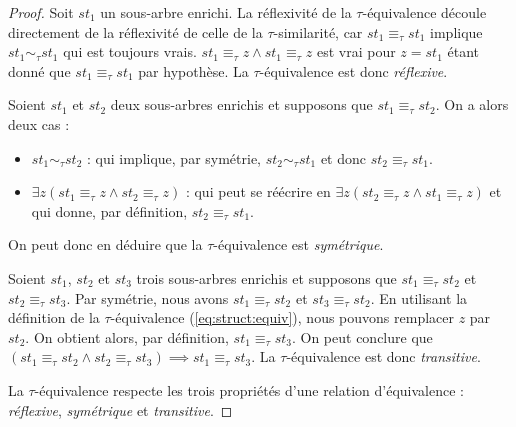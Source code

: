 \begin{proof}
    Soit $st_1$ un sous-arbre enrichi.
    La réflexivité de la $\tau$-équivalence découle directement de la réflexivité de celle de la $\tau$-similarité, car $st_1 \equiv_\tau st_1$ implique $st_1 \sim_\tau st_1$ qui est toujours vrais.
    $st_1 \equiv_\tau z \land st_1 \equiv_\tau z$ est vrai pour $z = st_1$ étant donné que $st_1 \equiv_\tau st_1$ par hypothèse.
    La $\tau$-équivalence est donc \emph{réflexive}.

    Soient $st_1$ et $st_2$ deux sous-arbres enrichis et supposons que $st_1 \equiv_\tau st_2$.
    On a alors deux cas :
    \begin{itemize}
        \item $st_1 \sim_\tau st_2$ : qui implique, par symétrie, $st_2 \sim_\tau st_1$ et donc $st_2 \equiv_\tau st_1$.
        \item $\exists z (st_1 \equiv_\tau z \land st_2 \equiv_\tau z)$ : qui peut se réécrire en $\exists z (st_2 \equiv_\tau z \land st_1 \equiv_\tau z)$ et qui donne, par définition, $st_2 \equiv_\tau st_1$.
    \end{itemize}
    On peut donc en déduire que la $\tau$-équivalence est \emph{symétrique}.

    Soient $st_1$, $st_2$ et $st_3$ trois sous-arbres enrichis et supposons que $st_1 \equiv_\tau st_2$ et $st_2 \equiv_\tau st_3$.
    Par symétrie, nous avons $st_1 \equiv_\tau st_2$ et $st_3 \equiv_\tau st_2$.
    En utilisant la définition de la $\tau$-équivalence (\ref{eq:struct:equiv}), nous pouvons remplacer $z$ par $st_2$.
    On obtient alors, par définition, $st_1 \equiv_\tau st_3$.
    On peut conclure que $(st_1 \equiv_\tau st_2 \land st_2 \equiv_\tau st_3) \implies st_1 \equiv_\tau st_3$.
    La $\tau$-équivalence est donc \emph{transitive}.

    La $\tau$-équivalence respecte les trois propriétés d'une relation d'équivalence : \emph{réflexive}, \emph{symétrique} et \emph{transitive}.
\end{proof}

